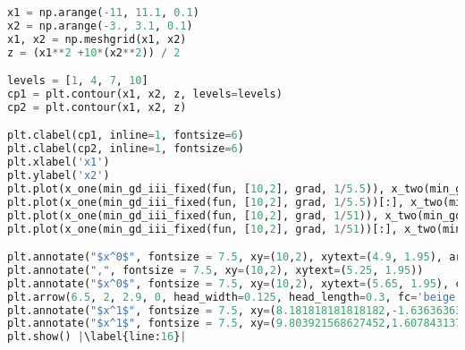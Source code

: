 \begin{lstlisting}[language=Python, label={lst:code6}, mathescape=true, breaklines=true, escapechar=|]
x1 = np.arange(-11, 11.1, 0.1)
x2 = np.arange(-3., 3.1, 0.1)
x1, x2 = np.meshgrid(x1, x2)
z = (x1**2 +10*(x2**2)) / 2

levels = [1, 4, 7, 10]
cp1 = plt.contour(x1, x2, z, levels=levels)
cp2 = plt.contour(x1, x2, z)

plt.clabel(cp1, inline=1, fontsize=6)
plt.clabel(cp2, inline=1, fontsize=6)
plt.xlabel('x1')
plt.ylabel('x2')
plt.plot(x_one(min_gd_iii_fixed(fun, [10,2], grad, 1/5.5)), x_two(min_gd_iii_fixed(fun, [10,2], grad, 1/5.5)), color='green')
plt.plot(x_one(min_gd_iii_fixed(fun, [10,2], grad, 1/5.5))[:], x_two(min_gd_iii_fixed(fun, [10,2], grad, 1/5.5))[:], "or", markerfacecolor="None", markeredgecolor='black', markeredgewidth=1.1, markersize=2.6)
plt.plot(x_one(min_gd_iii_fixed(fun, [10,2], grad, 1/51)), x_two(min_gd_iii_fixed(fun, [10,2], grad, 1/51)), color='red')
plt.plot(x_one(min_gd_iii_fixed(fun, [10,2], grad, 1/51))[:], x_two(min_gd_iii_fixed(fun, [10,2], grad, 1/51))[:], "or", markerfacecolor="None", markeredgecolor='black', markeredgewidth=1.1, markersize=2.6)

plt.annotate("$x^0$", fontsize = 7.5, xy=(10,2), xytext=(4.9, 1.95), arrowprops=None, color='green')
plt.annotate(",", fontsize = 7.5, xy=(10,2), xytext=(5.25, 1.95))
plt.annotate("$x^0$", fontsize = 7.5, xy=(10,2), xytext=(5.65, 1.95), color='red')
plt.arrow(6.5, 2, 2.9, 0, head_width=0.125, head_length=0.3, fc='beige')
plt.annotate("$x^1$", fontsize = 7.5, xy=(8.181818181818182,-1.6363636363636367), xytext=(4.5,-1.7), arrowprops=dict(arrowstyle = '-|>', connectionstyle = 'Arc3', facecolor='g'), color='green')
plt.annotate("$x^1$", fontsize = 7.5, xy=(9.803921568627452,1.607843137254902), xytext=(6.3,1.55), arrowprops=dict(arrowstyle = '-|>', connectionstyle = 'Arc3',facecolor='r'), color='red')
plt.show() |\label{line:16}|
\end{lstlisting}

\newpage

